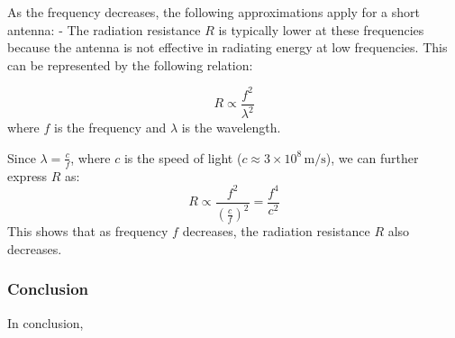 As the frequency decreases, the following approximations apply for a short antenna:
- The radiation resistance \(R\) is typically lower at these frequencies because the antenna is not effective in radiating energy at low frequencies. This can be represented by the following relation:

\[
R \propto \frac{f^2}{\lambda^2}
\]
where \(f\) is the frequency and \(\lambda\) is the wavelength.

Since \(\lambda = \frac{c}{f}\), where \(c\) is the speed of light (\(c \approx 3 \times 10^8 \, \text{m/s}\)), we can further express \(R\) as:
\[
R \propto \frac{f^2}{\left( \frac{c}{f} \right)^2} = \frac{f^4}{c^2}
\]
This shows that as frequency \(f\) decreases, the radiation resistance \(R\) also decreases.

\subsubsection{Conclusion}

In conclusion, 

